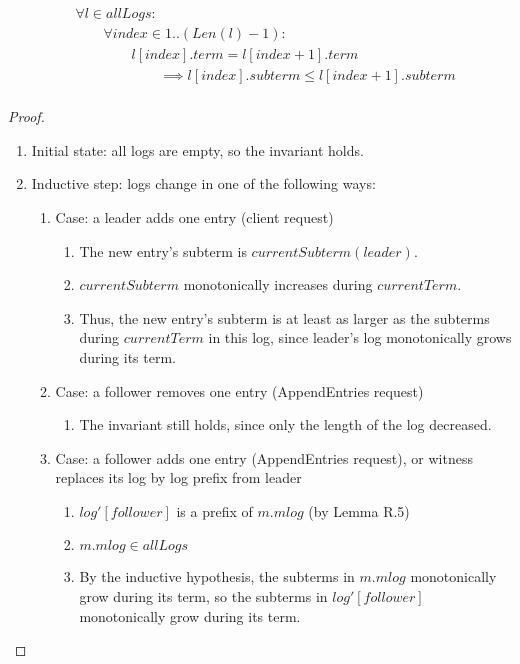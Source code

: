 \label{lemma:subterm-increase}
\begin{displaymath}
	\begin{aligned}
		&\forall l \in allLogs: \\
		&\qquad \forall index \in 1..(Len(l)-1): \\
		&\qquad \qquad l[index].term = l[index+1].term \\
		&\qquad \qquad \qquad \implies l[index].subterm \le l[index+1].subterm \\
	\end{aligned}
\end{displaymath}
\begin{proof}
	\begin{enumerate}
		\item Initial state: all logs are empty, so the invariant holds.
		\item Inductive step: logs change in one of the following ways:
		\begin{enumerate}
			\item Case: a leader adds one entry (client request)
			\begin{enumerate}
				\item The new entry's subterm is $currentSubterm(leader)$.
				\item $currentSubterm$ monotonically increases during $currentTerm$.
				\item Thus, the new entry's subterm is at least as larger as the subterms during $currentTerm$ in this log, since leader's log monotonically grows during its term.
			\end{enumerate}
			\item Case: a follower removes one entry (AppendEntries request)
			\begin{enumerate}
				\item The invariant still holds, since only the length of the log decreased.
			\end{enumerate}
			\item Case: a follower adds one entry (AppendEntries request), or witness replaces its log by log prefix from leader
			\begin{enumerate}
				\item $log'[follower]$ is a prefix of $m.mlog$ (by Lemma R.5)
				\item $m.mlog \in allLogs$
				\item By the inductive hypothesis, the subterms in $m.mlog$ monotonically grow during its term, so the subterms in $log'[follower]$ monotonically grow during its term.
			\end{enumerate}
		\end{enumerate}
	\end{enumerate}
\end{proof}

